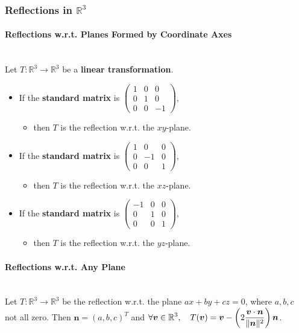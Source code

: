 \documentclass[../ma2001_notes.tex]{subfiles}
\begin{document}
\subsubsection{Reflections in $\mathbb{R}^3$}
\paragraph{Reflections w.r.t. Planes Formed by Coordinate Axes}\,\\
Let \(T:\mathbb{R}^3\to\mathbb{R}^3\) be a \textbf{linear transformation}.
\begin{itemize}
	\item If the \textbf{standard matrix} is \(\begin{pmatrix}
		1 & 0 & 0 \\ 0 & 1 & 0 \\ 0 & 0 & -1
	\end{pmatrix}\),
	\begin{itemize}
		\item then \(T\) is the reflection w.r.t. the \(xy\)-plane.
	\end{itemize}
	\item If the \textbf{standard matrix} is \(\begin{pmatrix}
		1 & 0 & 0 \\ 0 & -1 & 0 \\ 0 & 0 & 1
	\end{pmatrix}\),
	\begin{itemize}
		\item then \(T\) is the reflection w.r.t. the \(xz\)-plane.
	\end{itemize}
	\item If the \textbf{standard matrix} is \(\begin{pmatrix}
		-1 & 0 & 0 \\ 0 & 1 & 0 \\ 0 & 0 & 1
	\end{pmatrix}\),
	\begin{itemize}
		\item then \(T\) is the reflection w.r.t. the \(yz\)-plane.
	\end{itemize}
\end{itemize}

\paragraph{Reflections w.r.t. Any Plane}\,\\
Let \(T:\mathbb{R}^3\to\mathbb{R}^3\) be the reflection w.r.t. the plane \(ax+by+cz=0\), where \(a,b,c\) not all zero. Then \(\bm{n}=(a,b,c)^T\) and \(\displaystyle\forall\bm{v}\in\mathbb{R}^3,\quad T(\bm{v})=\bm{v}-\left(2\frac{\bm{v}\cdot\bm{n}}{\lVert\bm{n}\rVert^2}\right)\bm{n}\).
\end{document}
